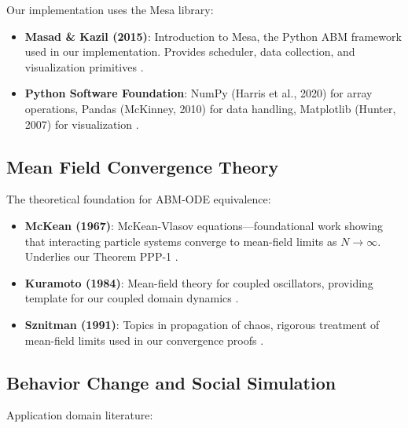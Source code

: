 Our implementation uses the Mesa library:

\begin{itemize}
\item \textbf{Masad \& Kazil (2015)}: Introduction to Mesa, the Python ABM framework
      used in our implementation. Provides scheduler, data collection, and
      visualization primitives \citep{masad2015mesa}.

\item \textbf{Python Software Foundation}: NumPy (Harris et al., 2020) for array
      operations, Pandas (McKinney, 2010) for data handling, Matplotlib (Hunter, 2007)
      for visualization \citep{harris2020numpy, mckinney2010pandas, hunter2007matplotlib}.
\end{itemize}

\subsection{Mean Field Convergence Theory}

The theoretical foundation for ABM-ODE equivalence:

\begin{itemize}
\item \textbf{McKean (1967)}: McKean-Vlasov equations---foundational work showing
      that interacting particle systems converge to mean-field limits as $N \to \infty$.
      Underlies our Theorem PPP-1 \citep{mckean1967propagation}.

\item \textbf{Kuramoto (1984)}: Mean-field theory for coupled oscillators, providing
      template for our coupled domain dynamics \citep{kuramoto1984chemical}.

\item \textbf{Sznitman (1991)}: Topics in propagation of chaos, rigorous treatment
      of mean-field limits used in our convergence proofs \citep{sznitman1991propagation}.
\end{itemize}

\subsection{Behavior Change and Social Simulation}

Application domain literature:

